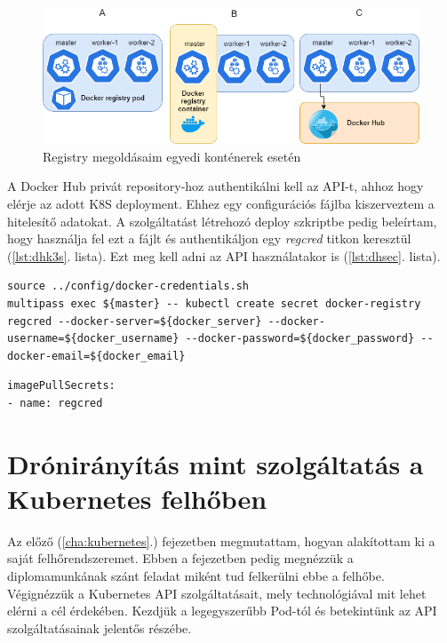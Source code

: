  \begin{figure}
 	\centering
 	\includegraphics[width=\linewidth]{figures/registry.png}
 	\caption{Registry megoldásaim egyedi konténerek esetén}
 	\label{fig:registry}
 \end{figure}

\noindent
A Docker Hub privát repository-hoz authentikálni kell az API-t, ahhoz hogy elérje az adott K8S deployment. Ehhez egy configurációs fájlba kiszerveztem a hitelesítő adatokat. A szolgáltatást létrehozó deploy szkriptbe pedig beleírtam, hogy használja fel ezt a fájlt és authentikáljon egy \emph{regcred} titkon keresztül (\ref{lst:dhk3s}. lista). Ezt meg kell adni az API használatakor is (\ref{lst:dhsec}. lista).
\begin{lstlisting}[caption={Docker Hub authentikáció K3S-ről},label={lst:dhk3s}]
source ../config/docker-credentials.sh
multipass exec ${master} -- kubectl create secret docker-registry regcred --docker-server=${docker_server} --docker-username=${docker_username} --docker-password=${docker_password} --docker-email=${docker_email}
\end{lstlisting}

\begin{lstlisting}[caption={K8S API secret definiálása a konténerekhez},label={lst:dhsec}]
imagePullSecrets:
- name: regcred
\end{lstlisting}


\chapter{Drónirányítás mint szolgáltatás a Kubernetes felhőben}

Az előző (\ref{cha:kubernetes}.) fejezetben megmutattam, hogyan alakítottam ki a saját felhőrendszeremet. Ebben a fejezetben pedig megnézzük a diplomamunkának szánt feladat miként tud felkerülni ebbe a felhőbe. Végignézzük a Kubernetes API szolgáltatásait, mely technológiával mit lehet elérni a cél érdekében. Kezdjük a legegyszerűbb Pod-tól és betekintünk az API szolgáltatásainak jelentős részébe.

